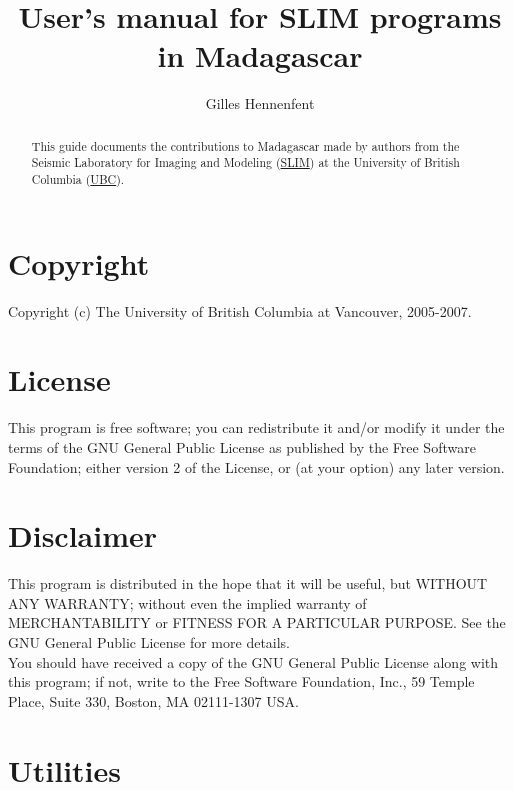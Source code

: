 \title{User's manual for SLIM programs in Madagascar}
\author{Gilles Hennenfent}

\maketitle

\begin{abstract}
  This guide documents the contributions to Madagascar made by authors
  from the Seismic Laboratory for Imaging and Modeling
  (\href{http://slim.eos.ubc.ca}{SLIM}) at the University of British
  Columbia (\href{http://www.ubc.ca}{UBC}).
\end{abstract}

\section{Copyright}
%
Copyright (c) The University of British Columbia at Vancouver,
2005-2007.

\section{License}
%
\noindent This program is free software; you can redistribute it
and/or modify it under the terms of the GNU General Public License as
published by the Free Software Foundation; either version 2 of the
License, or (at your option) any later version.

\section{Disclaimer}
%
This program is distributed in the hope that it will be useful, but
WITHOUT ANY WARRANTY; without even the implied warranty of
MERCHANTABILITY or FITNESS FOR A PARTICULAR PURPOSE.  See the GNU
General Public License for more details.\\
%
You should have received a copy of the GNU General Public License
along with this program; if not, write to the Free Software
Foundation, Inc., 59 Temple Place, Suite 330, Boston, MA 02111-1307
USA.

\newpage
\section{Utilities}


